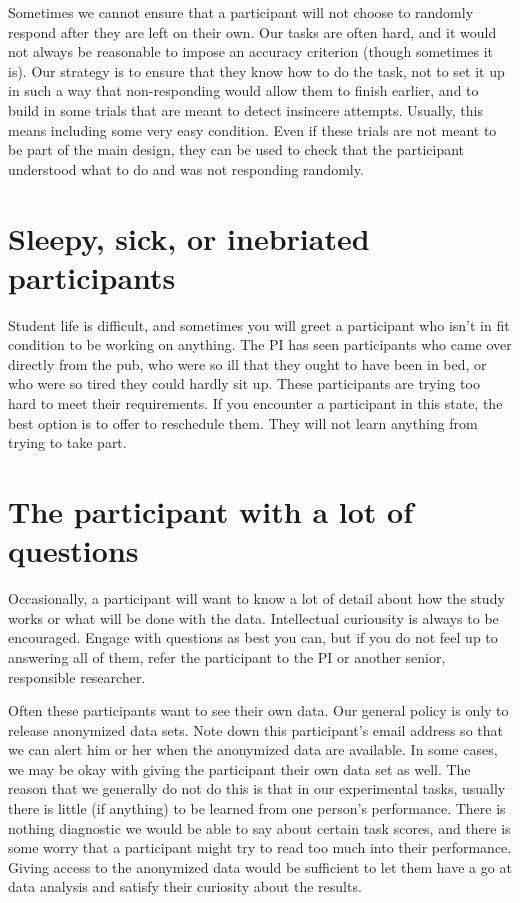 \documentclass[
  12pt,
]{book}
\begin{document}
Sometimes we cannot ensure that a participant will not choose to randomly respond after they are left on their own. Our tasks are often hard, and it would not always be reasonable to impose an accuracy criterion (though sometimes it is). Our strategy is to ensure that they know how to do the task, not to set it up in such a way that non-responding would allow them to finish earlier, and to build in some trials that are meant to detect insincere attempts. Usually, this means including some very easy condition. Even if these trials are not meant to be part of the main design, they can be used to check that the participant understood what to do and was not responding randomly.

\section{Sleepy, sick, or inebriated participants}\label{sleepy-sick-or-inebriated-participants}

Student life is difficult, and sometimes you will greet a participant who isn't in fit condition to be working on anything. The PI has seen participants who came over directly from the pub, who were so ill that they ought to have been in bed, or who were so tired they could hardly sit up. These participants are trying too hard to meet their requirements. If you encounter a participant in this state, the best option is to offer to reschedule them. They will not learn anything from trying to take part.

\section{The participant with a lot of questions}\label{the-participant-with-a-lot-of-questions}

Occasionally, a participant will want to know a lot of detail about how the study works or what will be done with the data. Intellectual curiousity is always to be encouraged. Engage with questions as best you can, but if you do not feel up to answering all of them, refer the participant to the PI or another senior, responsible researcher.

Often these participants want to see their own data. Our general policy is only to release anonymized data sets. Note down this participant's email address so that we can alert him or her when the anonymized data are available. In some cases, we may be okay with giving the participant their own data set as well. The reason that we generally do not do this is that in our experimental tasks, usually there is little (if anything) to be learned from one person's performance. There is nothing diagnostic we would be able to say about certain task scores, and there is some worry that a participant might try to read too much into their performance. Giving access to the anonymized data would be sufficient to let them have a go at data analysis and satisfy their curiosity about the results.
\end{document}

